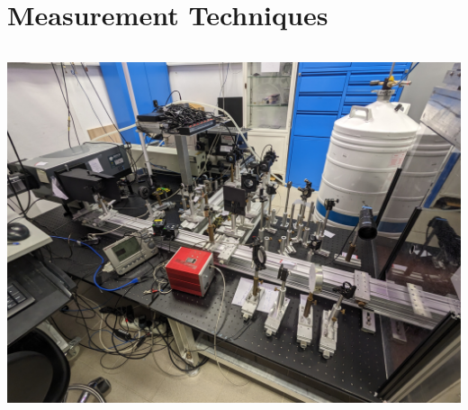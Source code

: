 \documentclass[
	10pt,
]{beamer}
\begin{document}
\section{Measurement Techniques}
\begin{frame}
	\begin{columns}
		\tableofcontents[currentsection]

		\centering
		\vfill
		\includegraphics[width=\textwidth]{../figures/setup.jpg}
	\end{columns}
\end{frame}
\end{document}
